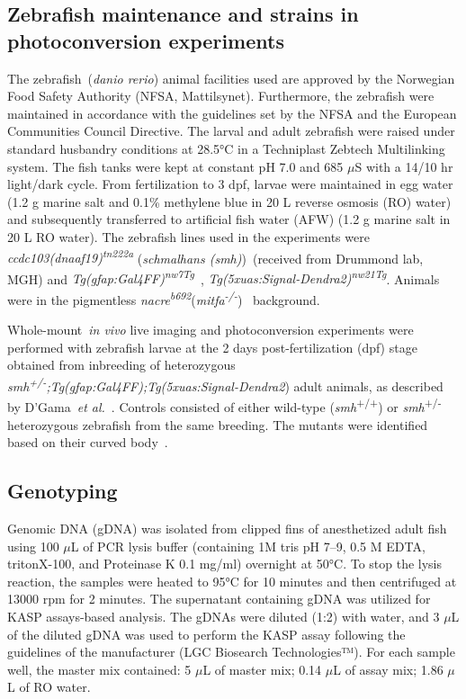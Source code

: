 \documentclass[fleqn]{wlscirep}
\begin{document}
\subsection*{Zebrafish maintenance and strains in photoconversion experiments}
The zebrafish~(\emph{danio rerio}) animal facilities used are approved by the Norwegian Food Safety Authority (NFSA, Mattilsynet). Furthermore, the zebrafish were maintained in accordance with the guidelines set by the NFSA and the European Communities Council Directive. The larval and adult zebrafish were raised under standard husbandry conditions at 28.5°C in a Techniplast Zebtech Multilinking system. The fish tanks were kept at constant pH 7.0 and 685 $\mu$S with a 14/10 hr light/dark cycle. From fertilization to 3 dpf, larvae were maintained in egg water (1.2 g marine salt and 0.1\% methylene blue in 20 L reverse osmosis (RO) water) and subsequently transferred to artificial fish water (AFW) (1.2 g marine salt in 20 L RO water). The zebrafish lines used in the experiments were \emph{ccdc103(dnaaf19)\textsuperscript{tn222a}} (\emph{schmalhans (smh)})~\cite{Jau-NianChen1997Left-rightZebrafish}(received from Drummond lab, MGH) and \emph{Tg(gfap:Gal4FF)\textsuperscript{nw7Tg}}~\cite{DiazVerdugo2019Glia-neuronSeizures}, \emph{Tg(5xuas:Signal-Dendra2)\textsuperscript{nw21Tg}}. Animals were in the pigmentless \emph{nacre\textsuperscript{b692}}(\emph{mitfa\textsuperscript{-/-}})~\cite{JamesA.Lister1999NacreFate} background.

Whole-mount~\emph{in vivo} live imaging and photoconversion experiments were performed with zebrafish larvae at the 2 days post-fertilization (dpf) stage obtained from inbreeding of heterozygous \emph{smh\textsuperscript{+/-};Tg(gfap:Gal4FF);Tg(5xuas:Signal-Dendra2}) adult animals, as described by D’Gama~\emph{et al.}~\cite{DGama2024Cilia-mediatedBrain}. Controls consisted of either wild-type (\emph{smh}\textsuperscript{+/+}) or \emph{smh}\textsuperscript{+/-} heterozygous zebrafish from the same breeding. The mutants were identified based on their curved body~\cite{Jau-NianChen1997Left-rightZebrafish}.

\subsection*{Genotyping}
Genomic DNA (gDNA) was isolated from clipped fins of anesthetized adult fish using 100 $\mu$L of PCR lysis buffer (containing 1M tris pH 7--9, 0.5 M EDTA, tritonX-100, and Proteinase K 0.1 mg/ml) overnight at 50°C. To stop the lysis reaction, the samples were heated to 95°C for 10 minutes and then centrifuged at 13000 rpm for 2 minutes. The supernatant containing gDNA was utilized for KASP assays-based analysis. The gDNAs were diluted (1:2) with water, and 3 $\mu$L of the diluted gDNA was used to perform the KASP assay following the guidelines of the manufacturer (LGC Biosearch Technologies™). For each sample well, the master mix contained: 5 $\mu$L of master mix; 0.14 $\mu$L of assay mix; 1.86 $\mu$L of RO water.
\end{document}
